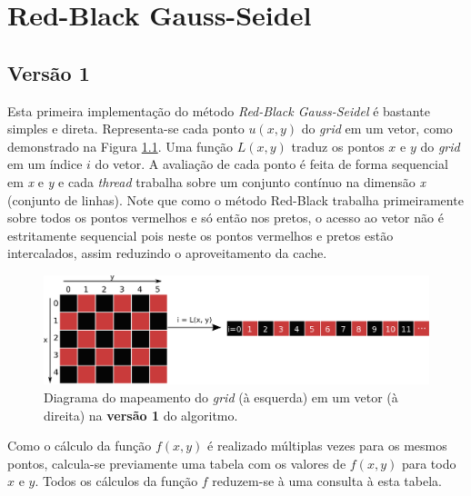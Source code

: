 \chapter{Red-Black Gauss-Seidel}
\label{cha:gauss-seidel}

\section{Versão 1}
\label{sec:gs-version1}

Esta primeira implementação do método \textit{Red-Black Gauss-Seidel} é bastante simples e direta. Representa-se cada ponto $u(x, y)$ do \textit{grid} em um vetor, como demonstrado na Figura \ref{fig:grid-v1}. Uma função $L(x, y)$ traduz os pontos $x$ e $y$ do \textit{grid} em um índice $i$ do vetor. A avaliação de cada ponto é feita de forma sequencial em \textit{x} e \textit{y} e cada \textit{thread} trabalha sobre um conjunto contínuo na dimensão \textit{x} (conjunto de linhas). Note que como o método Red-Black trabalha primeiramente sobre todos os pontos vermelhos e só então nos pretos, o acesso ao vetor não é estritamente sequencial pois neste os pontos vermelhos e pretos estão intercalados, assim reduzindo o aproveitamento da cache.

\begin{figure}[h]
    \centering
    \includegraphics[width=.8\textwidth]{figures/grid-v1}

    \caption{Diagrama do mapeamento do \textit{grid} (à esquerda) em um vetor (à direita) na \textbf{versão 1} do algoritmo.}
    \label{fig:grid-v1}
\end{figure}

Como o cálculo da função $f(x, y)$ é realizado múltiplas vezes para os mesmos pontos, calcula-se previamente uma tabela com os valores de $f(x, y)$ para todo $x$ e $y$. Todos os cálculos da função $f$ reduzem-se à uma consulta à esta tabela.

